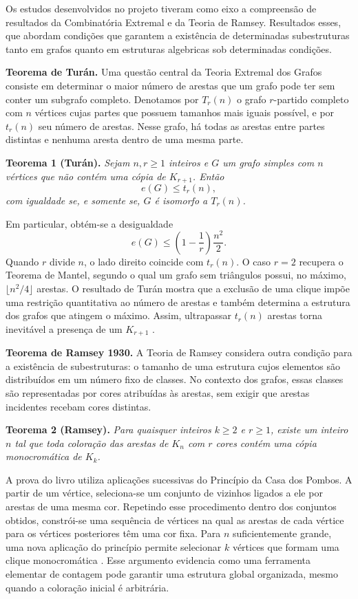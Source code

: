 Os estudos desenvolvidos no projeto tiveram como eixo a compreensão de resultados da Combinatória Extremal e da Teoria de Ramsey.  Resultados esses, que abordam condições que garantem a existência de determinadas subestruturas tanto em grafos quanto em estruturas algebricas sob determinadas condições. 

\medskip
\noindent\textbf{Teorema de Turán.}
Uma questão central da Teoria Extremal dos Grafos consiste em determinar o maior número de arestas que um grafo pode ter sem conter um subgrafo completo. Denotamos por $T_r(n)$ o grafo $r$-partido completo com $n$ vértices cujas partes que possuem tamanhos mais iguais possível, e por $t_r(n)$ seu número de arestas. Nesse grafo, há todas as arestas entre partes distintas e nenhuma aresta dentro de uma mesma parte.

\smallskip
\noindent\textbf{Teorema 1 (Turán).} \textit{Sejam $n,r\geq 1$ inteiros e $G$ um grafo simples com $n$ vértices que não contém uma cópia de $K_{r+1}$. Então
\[
    e(G)\leq t_r(n),
\]
com igualdade se, e somente se, $G$ é isomorfo a $T_r(n)$.}

Em particular, obtém-se a desigualdade
\[
    e(G)\leq \left(1-\frac{1}{r}\right)\frac{n^2}{2}.
\]
Quando $r$ divide $n$, o lado direito coincide com $t_r(n)$. O caso $r=2$ recupera o Teorema de Mantel, segundo o qual um grafo sem triângulos possui, no máximo, $\lfloor n^2/4\rfloor$ arestas. O resultado de Turán mostra que a exclusão de uma clique impõe uma restrição quantitativa ao número de arestas e também determina a estrutura dos grafos que atingem o máximo. Assim, ultrapassar $t_r(n)$ arestas torna inevitável a presença de um $K_{r+1}$ \cite[Seção 3.1]{impa}.

\medskip
\noindent\textbf{Teorema de Ramsey 1930.}
A Teoria de Ramsey considera outra condição para a existência de subestruturas: o tamanho de uma estrutura cujos elementos são distribuídos em um número fixo de classes. No contexto dos grafos, essas classes são representadas por cores atribuídas às arestas, sem exigir que arestas incidentes recebam cores distintas.

\smallskip
\noindent\textbf{Teorema 2 (Ramsey).} \textit{Para quaisquer inteiros $k\geq 2$ e $r\geq 1$, existe um inteiro $n$ tal que toda coloração das arestas de $K_n$ com $r$ cores contém uma cópia monocromática de $K_k$.}

A prova do livro utiliza aplicações sucessivas do Princípio da Casa dos Pombos. A partir de um vértice, seleciona-se um conjunto de vizinhos ligados a ele por arestas de uma mesma cor. Repetindo esse procedimento dentro dos conjuntos obtidos, constrói-se uma sequência de vértices na qual as arestas de cada vértice para os vértices posteriores têm uma cor fixa. Para $n$ suficientemente grande, uma nova aplicação do princípio permite selecionar $k$ vértices que formam uma clique monocromática \cite[Teorema 4.0.2]{impa}. Esse argumento evidencia como uma ferramenta elementar de contagem pode garantir uma estrutura global organizada, mesmo quando a coloração inicial é arbitrária.

